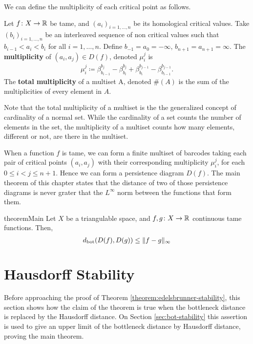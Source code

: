 We can define the multiplicity of each critical point as follows.

\begin{definition}[Multiplicity]
    Let $f \colon X \to \mathbb R $ be tame, and $ (a_i)_{i = 1, \dots, n} $ be its homological critical values. Take $ (b_i)_{i = 1, \dots, n} $ be an interleaved sequence of non critical values such that $ b_{i-1} < a_i < b_i $ for all $ i = 1, \dots, n $. Define $ b_{-1} = a_0 = -\infty $, $b_{n+1} = a_{n+1} = \infty $. The {\bf multiplicity} of $ (a_i, a_j) \in D(f) $, denoted $ \mu_i^j $ is
    \begin{align}
        \mu_i^j \coloneq \beta_{b_{i-1}}^{b_j} - \beta_{b_{i}}^{b_j} + \beta_{b_{i}}^{b_{j-1}} - \beta_{b_{i-1}}^{b_{j-1}}.
    \end{align}
    The {\bf total multiplicity} of a multiset A, denoted $ \#(A) $ is the sum of the multiplicities of every element in $A$.
\end{definition}

Note that the total multiplicity of a multiset is the the generalized concept of cardinality of a normal set. While the cardinality of a set counts the number of elements in the set, the multiplicity of a multiset counts how many elements, different or not, are there in the multiset.

When a function $ f $ is tame, we can form a finite multiset of barcodes taking each pair of critical points $ (a_i, a_j) $ with their corresponding multiplicity $ \mu_i^j $, for each $ 0 \leq i < j \leq n+ 1 $. Hence we can form a persistence diagram $ D(f) $. The main theorem of this chapter states that the distance of two of those persistence diagrams is never grater that the $L^\infty $ norm between the functions that form them.

\begin{restatable}{theorem}{Main} \label{theorem:edelsbrunner-stability}
    Let $ X $ be a triangulable space, and $ f, g\colon X \to \mathbb R $ continuous tame functions. Then,
    \begin{align}
        d_{\operatorname{bot}} (D(f), D(g)) \leq \|f-g\|_\infty
    \end{align}
\end{restatable}

\section{Hausdorff Stability}

Before approaching the proof of Theorem \ref{theorem:edelsbrunner-stability}, this section shows how the claim of the theorem is true when the bottleneck distance is replaced by the Hausdorff distance. On Section \ref{sec:bot-stability} this assertion is used to give an upper limit of the bottleneck distance by Hausdorff distance, proving the main theorem.

